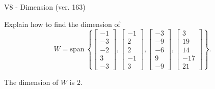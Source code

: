 \begin{exercise}
  \begin{exerciseTitle}V8 - Dimension (ver. 163)\end{exerciseTitle}
  \begin{exerciseStatement}
    Explain how to find the dimension of 
\[W=\mathrm{span}\ \left\{\left[\begin{array}{r}
-1 \\
-3 \\
-2 \\
3 \\
-3
\end{array}\right] , \left[\begin{array}{r}
-1 \\
2 \\
2 \\
-1 \\
3
\end{array}\right] , \left[\begin{array}{r}
-3 \\
-9 \\
-6 \\
9 \\
-9
\end{array}\right] , \left[\begin{array}{r}
3 \\
19 \\
14 \\
-17 \\
21
\end{array}\right]\right\}.\]



  \end{exerciseStatement}
  \begin{exerciseAnswer}
   The dimension of \(W\) is  \(2\).
  


  \end{exerciseAnswer}
\end{exercise}